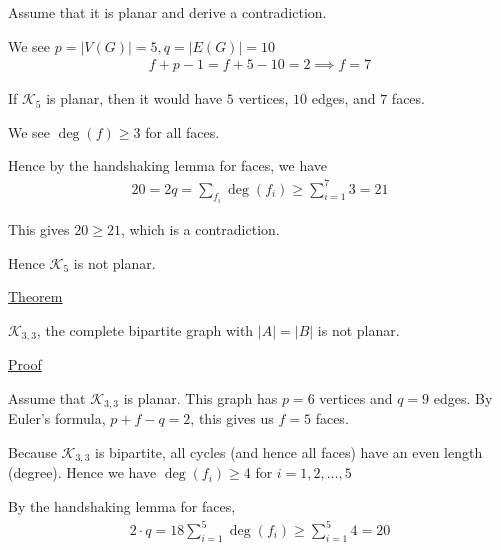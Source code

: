\documentclass{article}
\begin{document}
Assume that it is planar and derive a contradiction. 

We see $p = |V(G)| = 5, q = |E(G)| = 10$
\begin{align*}
    f + p - 1 = f + 5 - 10 = 2 \implies f = 7
\end{align*}

If $\mathcal{K}_5$ is planar, then it would have $5$ vertices, $10$ edges, and $7$ faces. 

We see $\deg(f) \ge 3$ for all faces. 

Hence by the handshaking lemma for faces, we have
\begin{align*}
    20 = 2q = \sum_{f_i}\deg(f_i) \ge \sum_{i=1}^{7}3 = 21
\end{align*}

This gives $20 \ge 21$, which is a contradiction.

Hence $\mathcal{K}_5$ is not planar. 

\underline{Theorem}

$\mathcal{K}_{3,3}$, the complete bipartite graph with $|A| = |B|$ is not planar. 

\begin{center}
\end{center}

\underline{Proof}

Assume that $\mathcal{K}_{3,3}$ is planar. This graph has $p = 6$ vertices and $q = 9$ edges. By Euler's formula, $p + f - q = 2$, this gives us $f = 5$ faces. 

Because $\mathcal{K}_{3,3}$ is bipartite, all cycles (and hence all faces) have an even length (degree). Hence we have $\deg(f_i) \ge 4$ for $i = 1,2,\ldots,5$

By the handshaking lemma for faces,
\begin{align*}
    2 \cdot q = 18 \sum_{i=1}^5 \deg(f_i) \ge \sum_{i=1}^5 4 = 20
\end{align*}
\end{document}
